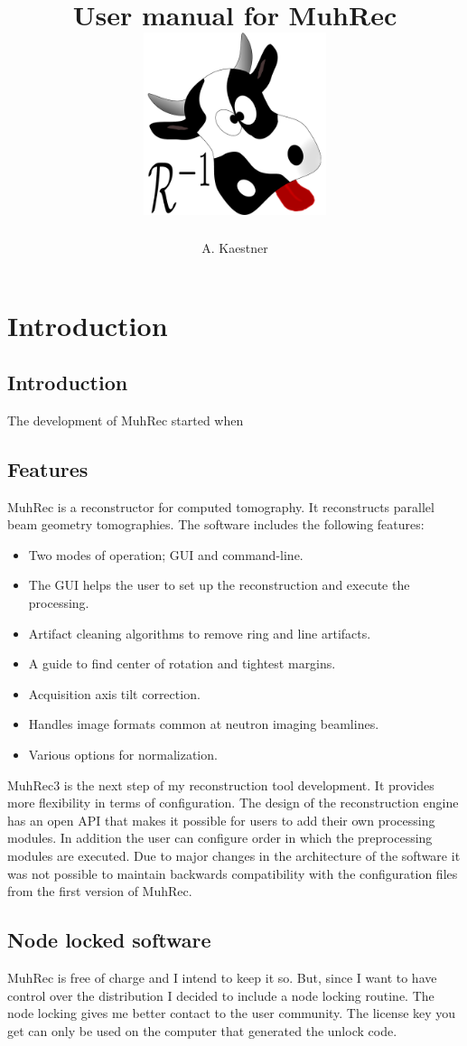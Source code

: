 \documentclass[a4paper]{scrreprt}
\title{User manual for MuhRec\\\vskip30pt\includegraphics[width=0.4\textwidth]{figures/muh_icon.pdf}}
\author{A. Kaestner}
\begin{document}
\maketitle
\tableofcontents
\chapter{Introduction}
\section{Introduction}
The development of MuhRec started when
\section{Features}
MuhRec is a reconstructor for computed tomography. It reconstructs parallel beam geometry tomographies.
The software includes the following features:
\begin{itemize}
\item Two modes of operation; GUI and command-line.
\item The GUI helps the user to set up the reconstruction and execute the processing.
\item Artifact cleaning algorithms to remove ring and line artifacts.
\item A guide to find center of rotation and tightest margins.
\item Acquisition axis tilt correction.
\item Handles image formats common at neutron imaging beamlines.
\item Various options for normalization.
\end{itemize}

MuhRec3 is the next step of my reconstruction tool development. It provides more flexibility in terms of configuration. The design of the reconstruction engine has an open API that makes it possible for users to add their own processing modules. In
addition the user can configure order in which the preprocessing modules are
executed. Due to major changes in the architecture of the software it was not
possible to maintain backwards compatibility with the configuration files from
the first version of MuhRec.

\section{Node locked software}
MuhRec is free of charge and I intend to keep it so. But, since I want to have control over
the distribution I decided to include a node locking routine. The node locking gives me
better contact to the user community. The license key you get can only be used on the
computer that generated the unlock code.
\end{document}
